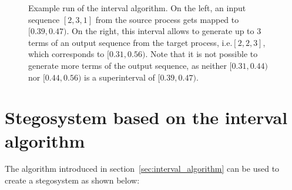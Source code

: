 \documentclass[12pt,twoside,a4paper]{article}
\makeatletter
\newcommand*{\ie}{i.e.\@\xspace}
\newcommand{\interval}[6] {
	\draw[#6] [i] (#1,#2+#4*#3) -- (#1,#2+#5*#3);
}
\newcommand{\intervalBottomLabel}[7] {
	\interval{#1}{#2}{#3}{#4}{#5}{#6}
	\node[#7] at (#1,#2+#4*#3) {\footnotesize #4};
}
\newcommand{\intervalBothLabels}[7] {
	\intervalBottomLabel{#1}{#2}{#3}{#4}{#5}{#6}{#7}
	\node[#7] at (#1,#2+#5*#3) {\footnotesize #5};
}
\makeatother
\begin{document}
\begin{figure}[h]
	
	\caption{\label{fig:interval_algorithm} Example run of the interval algorithm. On the left, an input sequence $[2,3,1]$ from the source process gets mapped to $[0.39,0.47)$. On the right, this interval allows to generate up to 3 terms of an output sequence from the target process, \ie $[2,2,3]$, which corresponds to $[0.31,0.56)$. Note that it is not possible to generate more terms of the output sequence, as neither $[0.31,0.44)$ nor $[0.44,0.56)$ is a superinterval of $[0.39,0.47)$.}
	
\end{figure}

\section{Stegosystem based on the interval algorithm}
\label{sec:plain_stegosystem}

The algorithm introduced in section~\ref{sec:interval_algorithm} can be used to create a stegosystem as shown below:
\end{document}
